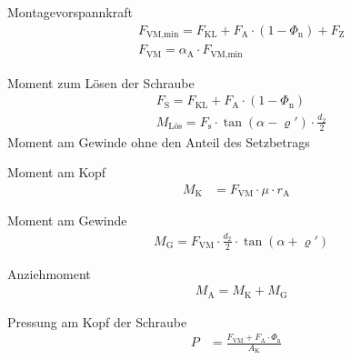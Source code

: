 \begin{eeqn}{Montagevorspannkraft}
	\begin{align}
		& F_\text{VM,min} = F_\text{KL} + F_\text{A}\cdot (1-\Phi_\text{n})+F_\text{Z} \\
		& F_\text{VM} = \alpha_\text{A}\cdot F_\text{VM,min}
	\end{align}
\end{eeqn}

\begin{eeqn}{Moment zum Lösen der Schraube}
	\begin{align}
		& F_\text{S} = F_\text{KL} + F_\text{A}\cdot (1-\Phi_\text{n}) \\
		& M_\text{Lös} = F_\text{s} \cdot \tan (\alpha - \varrho') \cdot \frac{d_2}{2}
	\end{align}
	Moment am Gewinde ohne den Anteil des Setzbetrags
\end{eeqn}

\begin{eeqn}{Moment am Kopf}
	\begin{align}
		M_\text{K} & = F_\text{VM} \cdot \mu \cdot r_\text{A}
	\end{align}
\end{eeqn}

\begin{eeqn}{Moment am Gewinde}
	\begin{align}
		& M_\text{G} = F_\text{VM} \cdot \frac{d_2}{2} \cdot \tan{(\alpha+\varrho')}
	\end{align}
\end{eeqn}

\begin{eeqn}{Anziehmoment}
	\begin{align}
		& M_\text{A} = M_\text{K} + M_\text{G}
	\end{align}
\end{eeqn}


\begin{eeqn}{Pressung am Kopf der Schraube}
	\begin{align}
		P &= \frac{F_\text{VM}+F_\text{A}\cdot\Phi_\text{n}}{A_\text{K}}
	\end{align}
\end{eeqn}

\newpage

